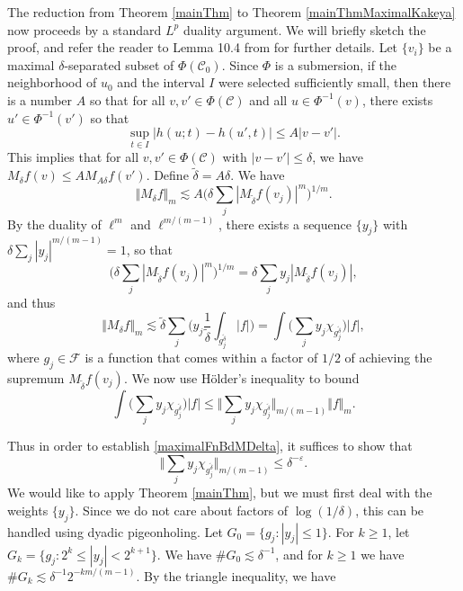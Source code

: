 \documentclass[letterpaper, reqno,11pt]{article}
\numberwithin{equation}{section}
\newcommand{\eps}{\varepsilon}
\numberwithin{thm}{section}
\theoremstyle{remark}
\begin{document}
The reduction from Theorem \ref{mainThm} to Theorem \ref{mainThmMaximalKakeya} now proceeds by a standard $L^p$ duality argument. We will briefly sketch the proof, and refer the reader to Lemma 10.4 from \cite{WolffBook} for further details. Let $\{v_i\}$ be a maximal $\delta$-separated subset of $\Phi(\mathcal{C}_0)$. Since $\Phi$ is a submersion, if the neighborhood of $u_0$ and the interval $I$ were selected sufficiently small, then there is a number $A$ so that for all $v,v'\in \Phi(\mathcal{C})$ and all $u\in\Phi^{-1}(v)$, there exists $u'\in\Phi^{-1}(v')$ so that
\begin{equation}\label{curvesComparableByA}
\sup_{t\in I}|h(u;t)-h(u',t)|\leq A|v-v'|.
\end{equation}
This implies that for all $v,v'\in \Phi(\mathcal{C})$ with $|v-v'|\leq\delta$, we have $M_\delta f(v)\leq A M_{A\delta} f(v')$. Define $\tilde\delta = A\delta$. We have
\[
\Vert M_\delta f\Vert_m \lesssim A\Big(\delta \sum_j |M_{\tilde\delta} f(v_j)|^m\Big)^{1/m}.
\]
By the duality of $\ell^m$ and $\ell^{m/(m-1)}$, there exists a sequence $\{y_j\}$ with $\delta\sum_j |y_j|^{m/(m-1)}=1$, so that
\[
\Big(\delta \sum_j |M_{\tilde\delta} f(v_j)|^m\Big)^{1/m}=\delta \sum_j y_j|M_{\tilde\delta} f(v_j)|,
\]
and thus 
\[
\Vert M_\delta f\Vert_m \lesssim  \tilde \delta \sum_j \Big(y_j \frac{1}{\tilde\delta}\int_{g_j^{\tilde\delta}}|f|\Big)=\int \Big(\sum_j y_j\chi_{g_j^{\tilde\delta}}\Big)|f|,
\]
where $g_j\in \mathcal{F}$ is a function that comes within a factor of $1/2$ of achieving the supremum $M_{\tilde\delta} f(v_j)$. We now use H\"older's inequality to bound
\[
\int \Big(\sum_j y_j\chi_{g_j^{\tilde\delta}}\Big)|f| \leq \Big\Vert \sum_j y_j\chi_{g_j^{\tilde\delta}} \Big\Vert_{m/(m-1)}\Vert f\Vert_m.
\] 

Thus in order to establish \eqref{maximalFnBdMDelta}, it suffices to show that
\begin{equation}\label{dualizedLpIneq}
\Vert \sum_j y_j\chi_{g_j^{\tilde\delta}} \Big\Vert_{m/(m-1)} \leq \delta^{-\eps}.
\end{equation}
We would like to apply Theorem \ref{mainThm}, but we must first deal with the weights $\{y_j\}$. Since we do not care about factors of $\log(1/\delta)$, this can be handled using dyadic pigeonholing. Let $G_0 = \{g_j\colon |y_j|\leq 1\}$. For $k\geq 1$, let $G_k = \{ g_j\colon 2^k\leq |y_j| < 2^{k+1}\}$. We have $\#G_0\lesssim \delta^{-1}$, and for $k\geq 1$ we have $\# G_k\lesssim \delta^{-1} 2^{-km/(m-1)}$. By the triangle inequality, we have
\end{document}
